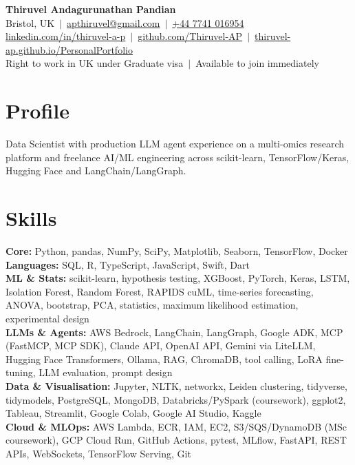 \documentclass[a4paper,11pt]{article}
\begin{document}
\fontsize{11}{13.2}\selectfont

\begin{center}
  {\LARGE\bfseries Thiruvel Andagurunathan Pandian}\\[3pt]
  Bristol, UK \,$|$\, \href{mailto:apthiruvel@gmail.com}{apthiruvel@gmail.com} \,$|$\, \href{tel:+447741016954}{+44 7741 016954}\\[1pt]
\href{https://www.linkedin.com/in/thiruvel-a-p/}{linkedin.com/in/thiruvel-a-p} \,$|$\, \href{https://github.com/Thiruvel-AP}{github.com/Thiruvel-AP} \,$|$\, \href{https://thiruvel-ap.github.io/PersonalPortfolio/}{thiruvel-ap.github.io/PersonalPortfolio}\\[1pt]
  Right to work in UK under Graduate visa \,$|$\, Available to join immediately
\end{center}

\section{Profile}
Data Scientist with production LLM agent experience on a multi-omics research platform and freelance AI/ML engineering across scikit-learn, TensorFlow/Keras, Hugging Face and LangChain/LangGraph.

\section{Skills}
\textbf{Core:} Python, pandas, NumPy, SciPy, Matplotlib, Seaborn, TensorFlow, Docker\\[2pt]
\textbf{Languages:} SQL, R, TypeScript, JavaScript, Swift, Dart\\[2pt]
\textbf{ML \& Stats:} scikit-learn, hypothesis testing, XGBoost, PyTorch, Keras, LSTM, Isolation Forest, Random Forest, RAPIDS cuML, time-series forecasting, ANOVA, bootstrap, PCA, statistics, maximum likelihood estimation, experimental design\\[2pt]
\textbf{LLMs \& Agents:} AWS Bedrock, LangChain, LangGraph, Google ADK, MCP (FastMCP, MCP SDK), Claude API, OpenAI API, Gemini via LiteLLM, Hugging Face Transformers, Ollama, RAG, ChromaDB, tool calling, LoRA fine-tuning, LLM evaluation, prompt design\\[2pt]
\textbf{Data \& Visualisation:} Jupyter, NLTK, networkx, Leiden clustering, tidyverse, tidymodels, PostgreSQL, MongoDB, Databricks/PySpark (coursework), ggplot2, Tableau, Streamlit, Google Colab, Google AI Studio, Kaggle\\[2pt]
\textbf{Cloud \& MLOps:} AWS Lambda, ECR, IAM, EC2, S3/SQS/DynamoDB (MSc coursework), GCP Cloud Run, GitHub Actions, pytest, MLflow, FastAPI, REST APIs, WebSockets, TensorFlow Serving, Git
\end{document}
